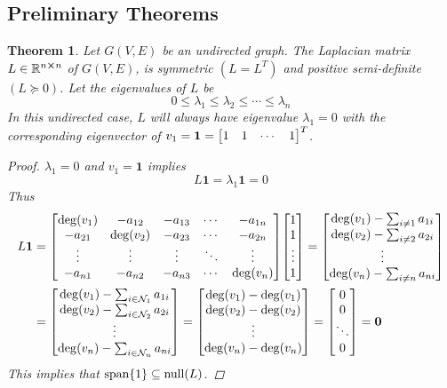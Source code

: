 \documentclass[]{article}
\numberwithin{equation}{section}
\newcommand{\R}{\mathbb{R}}
\newtheorem{theorem}{Theorem}
\begin{document}
\newpage
\subsection{Preliminary Theorems}
\begin{theorem}\label{thm:L_eig_1_eq_zero}
	Let $G(V,E)$ be an undirected graph.
	The Laplacian matrix $L\in\R^{n \cross n}$ of $G(V,E)$, is symmetric $(L=L^T)$ and positive semi-definite $(L\succeq 0)$.
	Let the eigenvalues of $L$ be\[
		0 \leq \lambda_1 \leq \lambda_2 \leq \cdots \leq \lambda_n
	\] In this undirected case, $L$ will always have eigenvalue $\lambda_1 = 0$ with the corresponding eigenvector of $v_1 = \mathbf{1} = \mqty[1 &1 &\cdots &1]^T$.
	\begin{proof}
		$\lambda_1 = 0$ and $v_1 = \mathbf{1}$ implies\[
			L \mathbf{1} = \lambda_1 \mathbf{1} = 0
		\]Thus
		\begin{align*}
			L \mathbf{1} 
				&= \mqty[
					\deg(v_1)	&-a_{12}	&-a_{13}	&\cdots	&-a_{1n}\\
					-a_{21}		&\deg(v_2)	&-a_{23}	&\cdots	&-a_{2n}\\
					\vdots		&\vdots		&\vdots		&\ddots	&\vdots\\
					-a_{n1}		&-a_{n2}	&-a_{n3}	&\cdots	&\deg(v_n)
				] \mqty[
					1  \\1	\\\vdots	\\1
				] = \mqty[
					\deg(v_1) - \sum_{i\neq 1} a_{1i}\\
					\deg(v_2) - \sum_{i\neq 2} a_{2i}\\
					\vdots\\
					\deg(v_n) - \sum_{i\neq n} a_{ni}\\
				]\\
				&= \mqty[
					\deg(v_1) - \sum_{i\in\mathcal{N}_1} a_{1i}\\
					\deg(v_2) - \sum_{i\in\mathcal{N}_2} a_{2i}\\
					\vdots\\
					\deg(v_n) - \sum_{i\in\mathcal{N}_n} a_{ni}\\
				] = \mqty[
					\deg(v_1) - \deg(v_1)\\
					\deg(v_2) - \deg(v_2)\\
					\vdots\\
					\deg(v_n) - \deg(v_n)\\
				] = \mqty[
					0\\	0\\	\ddots\\ 0
				] = \mathbf{0}
		\end{align*}
		This implies that $\text{span}\qty{1} \subseteq \text{null}\qty(L)$.
	\end{proof}
\end{theorem}
\end{document}
